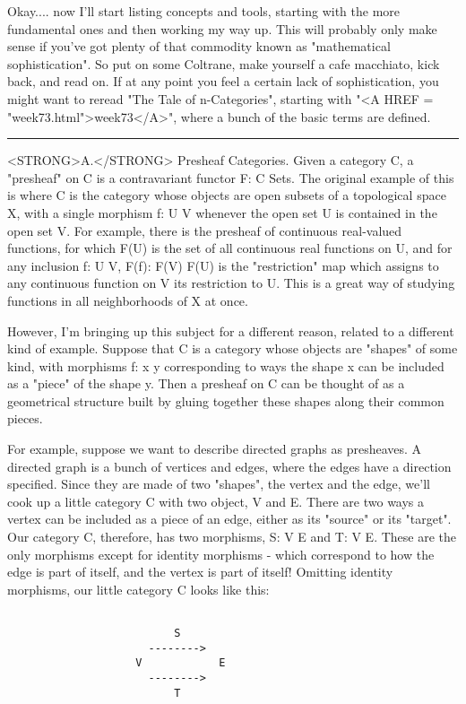 Okay.... now I'll start listing concepts and tools, starting with the
more fundamental ones and then working my way up.  This will probably
only make sense if you've got plenty of that commodity known as
"mathematical sophistication".  So put on some Coltrane, make yourself a
cafe macchiato, kick back, and read on.  If at any point you feel a
certain lack of sophistication, you might want to reread "The Tale of
n-Categories", starting with "<A HREF = "week73.html">week73</A>", where a bunch of the basic terms
are defined.
\par\noindent\rule{\textwidth}{0.4pt}
<STRONG>A.</STRONG>  Presheaf Categories.  Given a category C, a "presheaf" on C is a
contravariant functor F: C \to  Sets.  The original example of this is
where C is the category whose objects are open subsets of a topological
space X, with a single morphism f: U \to  V whenever the open set U is
contained in the open set V.  For example, there is the presheaf of
continuous real-valued functions, for which F(U) is the set of all
continuous real functions on U, and for any inclusion f: U \to  V, 
F(f): F(V) \to  F(U) is the "restriction" map which assigns to any
continuous function on V its restriction to U.  This is a great way of
studying functions in all neighborhoods of X at once.  

However, I'm bringing up this subject for a different reason, related to
a different kind of example.  Suppose that C is a category whose objects
are "shapes" of some kind, with morphisms f: x \to  y corresponding to
ways the shape x can be included as a "piece" of the shape y.  Then a
presheaf on C can be thought of as a geometrical structure built by
gluing together these shapes along their common pieces.  

For example, suppose we want to describe directed graphs as presheaves.
A directed graph is a bunch of vertices and edges, where the edges have
a direction specified.  Since they are made of two "shapes", the vertex
and the edge, we'll cook up a little category C with two object, V and
E.  There are two ways a vertex can be included as a piece of an edge,
either as its "source" or its "target".  Our category C, therefore, has
two morphisms, S: V \to  E and T: V \to  E.  These are the only morphisms
except for identity morphisms - which correspond to how the edge is
part of itself, and the vertex is part of itself!  Omitting identity
morphisms, our little category C looks like this:

\begin{verbatim}

                          S
                      -------->
                    V            E
                      -------->
                          T

\end{verbatim}
    

